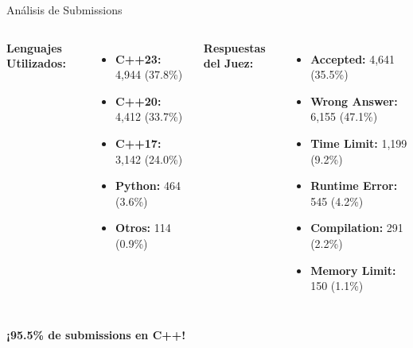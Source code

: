 \documentclass{beamer}
\begin{document}
\begin{frame}{Análisis de Submissions}
\begin{center}

\begin{columns}[t]
\textbf{Lenguajes Utilizados:}

\vspace{0.1cm}

\small
\begin{itemize}
\item \textbf{C++23:} 4,944 (37.8\%)
\item \textbf{C++20:} 4,412 (33.7\%)
\item \textbf{C++17:} 3,142 (24.0\%)
\item \textbf{Python:} 464 (3.6\%)
\item \textbf{Otros:} 114 (0.9\%)
\end{itemize}

\textbf{Respuestas del Juez:}

\vspace{0.1cm}

\small
\begin{itemize}
\item \textbf{Accepted:} 4,641 (35.5\%)
\item \textbf{Wrong Answer:} 6,155 (47.1\%)
\item \textbf{Time Limit:} 1,199 (9.2\%)
\item \textbf{Runtime Error:} 545 (4.2\%)
\item \textbf{Compilation:} 291 (2.2\%)
\item \textbf{Memory Limit:} 150 (1.1\%)
\end{itemize}
\end{columns}

\vspace{0.3cm}

\textbf{¡95.5\% de submissions en C++!}
\end{center}
\end{frame}
\end{document}
